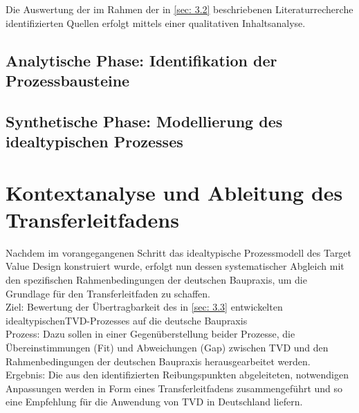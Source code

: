 
Die Auswertung der im Rahmen der in \cref{sec: 3.2} beschriebenen Literaturrecherche identifizierten Quellen erfolgt mittels einer qualitativen Inhaltsanalyse.

\subsection{Analytische Phase: Identifikation der Prozessbausteine}
\label{3.3.1}

\subsection{Synthetische Phase: Modellierung des idealtypischen Prozesses}


\FloatBarrier

\section{Kontextanalyse und Ableitung des Transferleitfadens}
\label{sec: 3.4}

Nachdem im vorangegangenen Schritt das idealtypische Prozessmodell des Target Value Design konstruiert wurde, erfolgt nun dessen systematischer Abgleich mit den spezifischen Rahmenbedingungen der deutschen Baupraxis, um die Grundlage für den Transferleitfaden zu schaffen.\\

Ziel: Bewertung der Übertragbarkeit des in \cref{sec: 3.3} entwickelten idealtypischen\ac{TVD}-Prozesses auf die deutsche Baupraxis\\

Prozess: Dazu sollen in einer Gegenüberstellung beider Prozesse, die Übereinstimmungen (Fit) und Abweichungen (Gap) zwischen \ac{TVD} und den Rahmenbedingungen der deutschen Baupraxis herausgearbeitet werden.\\

Ergebnis: Die aus den identifizierten Reibungspunkten abgeleiteten, notwendigen Anpassungen werden in Form eines Transferleitfadens zusammengeführt und so eine Empfehlung für die Anwendung von \ac{TVD} in Deutschland liefern.\\


